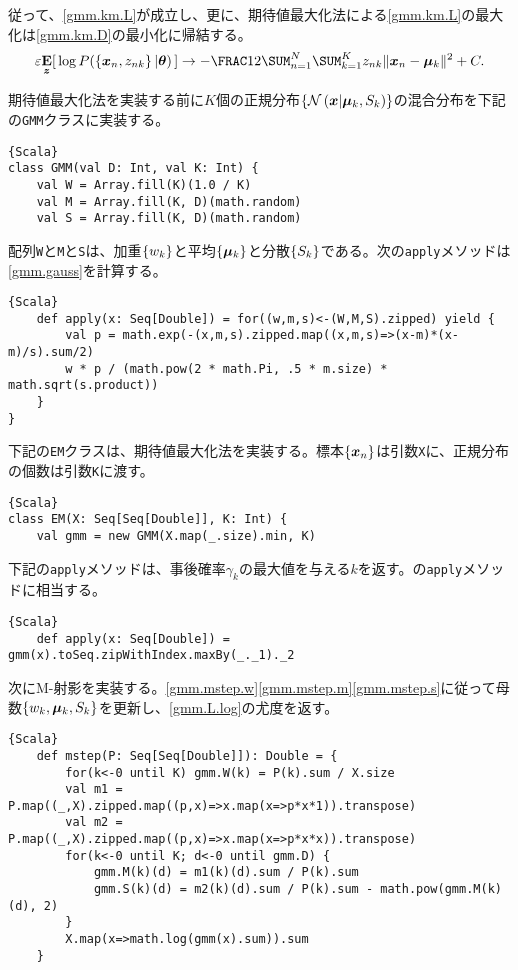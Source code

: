\documentclass[10pt,a4paper]{book}
\begin{document}
従って、\eqref{gmm.km.L}が成立し、更に、期待値最大化法による\eqref{gmm.km.L}の最大化は\eqref{gmm.km.D}の最小化に帰結する。
%
\begin{equation}
\label{eq:gmm.km.L}
\varepsilon \E[\bm{z}]{\log P(\seq{\bm{x}_n,z_{nk}}|\bm{\theta})} \to -\frac{1}{2} \sum_{n=1}^N \sum_{k=1}^K z_{nk} \|\bm{x}_n-\bm{\mu}_k\|^2 + C.
\end{equation}

期待値最大化法を実装する前に$K$個の正規分布$\seq{\Nd{\bm{x}|\bm{\mu}_k,S_k}}$の混合分布を下記の\texttt{GMM}クラスに実装する。

\begin{Verbatim}{Scala}
class GMM(val D: Int, val K: Int) {
	val W = Array.fill(K)(1.0 / K)
	val M = Array.fill(K, D)(math.random)
	val S = Array.fill(K, D)(math.random)
\end{Verbatim}

配列\texttt{W}と\texttt{M}と\texttt{S}は、加重$\seq{w_k}$と平均$\seq{\bm{\mu}_k}$と分散$\seq{S_k}$である。次の\texttt{apply}メソッドは\eqref{gmm.gauss}を計算する。

\begin{Verbatim}{Scala}
	def apply(x: Seq[Double]) = for((w,m,s)<-(W,M,S).zipped) yield {
		val p = math.exp(-(x,m,s).zipped.map((x,m,s)=>(x-m)*(x-m)/s).sum/2)
		w * p / (math.pow(2 * math.Pi, .5 * m.size) * math.sqrt(s.product))
	}
}
\end{Verbatim}

下記の\texttt{EM}クラスは、期待値最大化法を実装する。標本$\seq{\bm{x}_n}$は引数\texttt{X}に、正規分布の個数は引数\texttt{K}に渡す。

\begin{Verbatim}{Scala}
class EM(X: Seq[Seq[Double]], K: Int) {
	val gmm = new GMM(X.map(_.size).min, K)
\end{Verbatim}

下記の\texttt{apply}メソッドは、事後確率$\gamma_k$の最大値を与える$k$を返す。の\texttt{apply}メソッドに相当する。

\begin{Verbatim}{Scala}
	def apply(x: Seq[Double]) = gmm(x).toSeq.zipWithIndex.maxBy(_._1)._2
\end{Verbatim}

次にM-射影を実装する。\eqref{gmm.mstep.w}\eqref{gmm.mstep.m}\eqref{gmm.mstep.s}に従って母数$\seq{w_k,\bm{\mu}_k,S_k}$を更新し、\eqref{gmm.L.log}の尤度を返す。

\begin{Verbatim}{Scala}
	def mstep(P: Seq[Seq[Double]]): Double = {
		for(k<-0 until K) gmm.W(k) = P(k).sum / X.size
		val m1 = P.map((_,X).zipped.map((p,x)=>x.map(x=>p*x*1)).transpose)
		val m2 = P.map((_,X).zipped.map((p,x)=>x.map(x=>p*x*x)).transpose)
		for(k<-0 until K; d<-0 until gmm.D) {
			gmm.M(k)(d) = m1(k)(d).sum / P(k).sum
			gmm.S(k)(d) = m2(k)(d).sum / P(k).sum - math.pow(gmm.M(k)(d), 2)
		}
		X.map(x=>math.log(gmm(x).sum)).sum
	}
\end{Verbatim}
\end{document}
